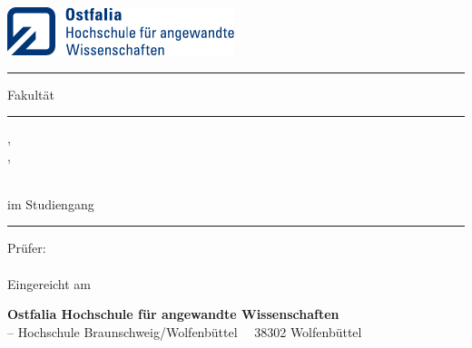 
    
\begin{titlepage}
    \setlength{\parskip}{0cm}
    \setlength{\parindent}{0cm}
    \sffamily
    \begin{minipage}[t]{66mm}
        \includegraphics[height=14mm]{../figs/ostfalia_logo}\par
        \hfill%
        \begin{minipage}[t]{49mm}
            \color{ostfalia-wf-blue}\hrule height 1pt
            \vspace{0.5\baselineskip}
            Fakultät \myFakultaet
        \end{minipage}
    \end{minipage}
        
    \vfill
    
    {\color[gray]{0.66}\hrule height 1pt}\vspace{0.5\baselineskip}
    
    {\large
        \myAuthorA, \AutorAMartikelnummer \\
        \myAuthorB, \AutorBMartikelnummer
    \par}\vspace{2\baselineskip}
    
    {\Huge
        \myTitle
    \par}\vspace{2\baselineskip}
    
    {\large
        \myTextArt\\
        im Studiengang \myStudiengang\\
    \par}
    {\color[gray]{0.66}\hrule height 1pt}\vspace{4\baselineskip}

    {\large
        Prüfer:\\
        \myPruefer\\[1\baselineskip]
        Eingereicht am \einreichDatum
    \par}

    \vfill
    \textUeberOstfaliaBox    
    \begin{tcolorbox}[size=tight,
        oversize,
        sharp corners,
        colback=ostfalia-blue,
        colframe=ostfalia-blue,
        boxsep=2ex]
        \color{white}
        \textbf{Ostfalia Hochschule für angewandte Wissenschaften}\\
        -- Hochschule Braunschweig/Wolfenbüttel \textbullet~\strasseFackultaet \textbullet~38302 Wolfenbüttel
    \end{tcolorbox}
    
\end{titlepage}

\restoregeometry